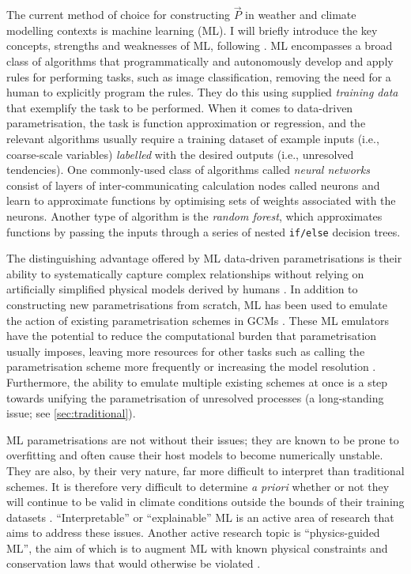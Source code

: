 \documentclass[../main.tex]{subfiles}
\begin{document}
The current method of choice for constructing $\vec{P}$ in weather and climate
modelling contexts is machine learning (ML). I will briefly introduce the key
concepts, strengths and weaknesses of ML, following \textcite{beucler2022}. ML
encompasses a broad class of algorithms that programmatically and autonomously
develop and apply rules for performing tasks, such as image classification,
removing the need for a human to explicitly program the rules. They do this
using supplied \emph{training data} that exemplify the task to be performed.
When it comes to data-driven parametrisation, the task is function
approximation or regression, and the relevant algorithms usually require a
training dataset of example inputs (i.e., coarse-scale variables)
\emph{labelled} with the desired outputs (i.e., unresolved tendencies). One
commonly-used class of algorithms called \emph{neural networks} consist of
layers of inter-communicating calculation nodes called neurons and learn to
approximate functions by optimising sets of weights associated with the
neurons. Another type of algorithm is the \emph{random forest}, which
approximates functions by passing the inputs through a series of nested
\texttt{if/else} decision trees.

The distinguishing advantage offered by ML data-driven parametrisations is
their ability to systematically capture complex relationships without relying
on artificially simplified physical models derived by humans
\parencite{irrgang2021,beucler2022}. In addition to constructing new
parametrisations from scratch, ML has been used to emulate the action of
existing parametrisation schemes in GCMs \parencite[e.g.,][]{gentine2018}.
These ML emulators have the potential to reduce the computational burden that
parametrisation usually imposes, leaving more resources for other tasks such as
calling the parametrisation scheme more frequently or increasing the model
resolution \parencite{beucler2022}. Furthermore, the ability to emulate
multiple existing schemes at once is a step towards unifying the
parametrisation of unresolved processes (a long-standing issue; see
\cref{sec:traditional}).

ML parametrisations are not without their issues; they are known to be prone to
overfitting and often cause their host models to become numerically unstable.
They are also, by their very nature, far more difficult to interpret than
traditional schemes. It is therefore very difficult to determine \emph{a
priori} whether or not they will continue to be valid in climate conditions
outside the bounds of their training datasets
\parencite{irrgang2021,beucler2022}. ``Interpretable'' or ``explainable'' ML is
an active area of research that aims to address these issues. Another active
research topic is ``physics-guided ML'', the aim of which is to augment ML with
known physical constraints and conservation laws that would otherwise be
violated \parencite[e.g.,][]{yuval2021}.


\ifSubfilesClassLoaded{%
    \emergencystretch=5em
    \printbibliography{}
}{}
\end{document}
